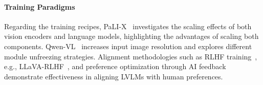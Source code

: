 \paragraph{Training Paradigms} Regarding the training recipes, PaLI-X~\citep{Chen2023PaLIX} investigates the scaling effects of both vision encoders and language models, highlighting the advantages of scaling both components. Qwen-VL~\citep{Qwen-VL} increases input image resolution and explores different module unfreezing strategies. Alignment methodologies such as RLHF training~\citep{ouyang2022instructgpt}, e.g., LLaVA-RLHF~\citep{2023llavarlhf}, and preference optimization through AI feedback~\citep{2023vlfeedback}
demonstrate effectiveness in aligning LVLMs with human preferences.

